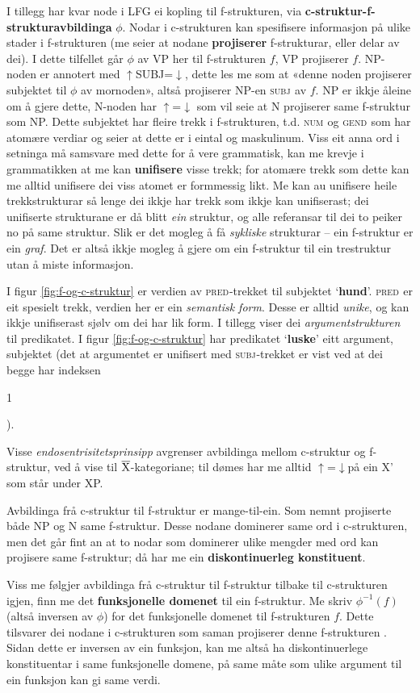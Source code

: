 \documentclass[11pt,a4paper,oneside,draft]{report}
\makeatletter
\newcommand{\xbar}{$\rm\overline{X}$}
\newcommand{\ind}[1]{{\avmoptions{}\begin{avm}\@{#1}\end{avm}}}
\newcommand{\F}[2]{\textsc{#1}\ensuremath{_{#2}}}
\newcommand{\SUBJ}{\F{subj}{}}
\newcommand{\GEND}{\F{gend}{}}
\newcommand{\NUM}{\F{num}{}}
\newcommand{\PRED}{\F{pred}{}}
\newcommand{\ua}{\ensuremath{\uparrow}}
\newcommand{\da}{\ensuremath{\downarrow}}
\newcommand{\p}[1]{`\textbf{#1}'}
\makeatother
\begin{document}
 I tillegg har kvar node i LFG ei kopling til f-strukturen, via
 \textbf{c-struktur-f-strukturavbildinga} $\phi{}$. Nodar i c-strukturen kan
 spesifisere informasjon på ulike stader i f-strukturen (me seier at
 nodane \textbf{projiserer} f-strukturar, eller delar av dei).  I dette
 tilfellet går $\phi$ av VP her til f-strukturen $f$, VP projiserer
 $f$. NP-noden er annotert med \ua{}SUBJ=\da{}, dette les me som at
 «denne noden projiserer subjektet til $\phi$ av mornoden», altså
 projiserer NP-en \SUBJ{} av $f$. NP er ikkje åleine om å gjere dette,
 N-noden har \ua{}=\da{} som vil seie at N projiserer same f-struktur
 som NP. Dette subjektet har fleire trekk i f-strukturen, t.d. \NUM{}
 og \GEND{} som har atomære verdiar og seier at dette er i eintal og
 maskulinum. Viss eit anna ord i setninga må samsvare med dette for å
 vere grammatisk, kan me krevje i grammatikken at me kan \textbf{unifisere}
 visse trekk; for atomære trekk som dette kan me alltid unifisere dei
 viss atomet er formmessig likt. Me kan au unifisere heile
 trekkstrukturar så lenge dei ikkje har trekk som ikkje kan
 unifiserast; dei unifiserte strukturane er då blitt \emph{ein} struktur,
 og alle referansar til dei to peiker no på same struktur. Slik er det
 mogleg å få \emph{sykliske} strukturar -- ein f-struktur er ein
 \emph{graf}. Det er altså ikkje mogleg å gjere om ein f-struktur til ein
 trestruktur utan å miste informasjon.

 I figur \ref{fig:f-og-c-struktur} er verdien av \PRED{}-trekket til
 subjektet \p{hund}. \PRED{} er eit spesielt trekk, verdien her er ein
 \emph{semantisk form}. Desse er alltid \emph{unike}, og kan ikkje unifiserast
 sjølv om dei har lik form. I tillegg viser dei \emph{argumentstrukturen}
 til predikatet. I figur \ref{fig:f-og-c-struktur} har predikatet
 \p{luske} eitt argument, subjektet (det at argumentet er unifisert
 med \SUBJ{}-trekket er vist ved at dei begge har indeksen \ind{1}).

 Visse \emph{endosentrisitetsprinsipp} avgrenser avbildinga mellom
 c-struktur og f-struktur, ved å vise til \xbar-kategoriane; til dømes
 har me alltid \ua=\da på ein X' som står under XP.

 Avbildinga frå c-struktur til f-struktur er mange-til-ein. Som nemnt
 projiserte både NP og N same f-struktur. Desse nodane dominerer same
 ord i c-strukturen, men det går fint an at to nodar som dominerer
 ulike mengder med ord kan projisere same f-struktur; då har me ein
 \textbf{diskontinuerleg konstituent}.

 Viss me følgjer avbildinga frå c-struktur til f-struktur tilbake til
 c-strukturen igjen, finn me det \textbf{funksjonelle domenet} til ein
 f-struktur. Me skriv $\phi^{-1}(f)$ (altså inversen av $\phi$) for
 det funksjonelle domenet til f-strukturen $f$. Dette tilsvarer dei
 nodane i c-strukturen som saman projiserer denne f-strukturen
 \citep[s.~126]{bresnan2001lfs}. Sidan dette er inversen av ein
 funksjon, kan me altså ha diskontinuerlege konstituentar i same
 funksjonelle domene, på same måte som ulike argument til ein funksjon
 kan gi same verdi.
\end{document}
